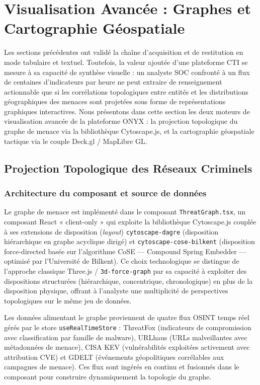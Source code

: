 \section{Visualisation Avancée : Graphes et Cartographie Géospatiale}

Les sections précédentes ont validé la chaîne d'acquisition et de restitution en mode tabulaire et textuel. Toutefois, la valeur ajoutée d'une plateforme CTI se mesure à sa capacité de synthèse visuelle : un analyste SOC confronté à un flux de centaines d'indicateurs par heure ne peut extraire de renseignement actionnable que si les corrélations topologiques entre entités et les distributions géographiques des menaces sont projetées sous forme de représentations graphiques interactives. Nous présentons dans cette section les deux moteurs de visualisation avancée de la plateforme ONYX : la projection topologique du graphe de menace via la bibliothèque Cytoscape.js, et la cartographie géospatiale tactique via le couple Deck.gl / MapLibre GL.

\subsection{Projection Topologique des Réseaux Criminels}

\subsubsection{Architecture du composant et source de données}

Le graphe de menace est implémenté dans le composant \texttt{ThreatGraph.tsx}, un composant React « client-only » qui exploite la bibliothèque Cytoscape.js couplée à ses extensions de disposition (\textit{layout}) \texttt{cytoscape-dagre} (disposition hiérarchique en graphe acyclique dirigé) et \texttt{cytoscape-cose-bilkent} (disposition force-directed basée sur l'algorithme CoSE --- Compound Spring Embedder --- optimisé par l'Université de Bilkent). Ce choix technologique se distingue de l'approche classique Three.js / \texttt{3d-force-graph} par sa capacité à exploiter des dispositions structurées (hiérarchique, concentrique, chronologique) en plus de la disposition physique, offrant à l'analyste une multiplicité de perspectives topologiques sur le même jeu de données.

Les données alimentant le graphe proviennent de quatre flux OSINT temps réel gérés par le store \texttt{useRealTimeStore} : ThreatFox (indicateurs de compromission avec classification par famille de malware), URLhaus (URLs malveillantes avec métadonnées de menace), CISA KEV (vulnérabilités exploitées activement avec attribution CVE) et GDELT (événements géopolitiques corrélables aux campagnes de menace). Ces flux sont ingérés en continu et fusionnés dans le composant pour construire dynamiquement la topologie du graphe.

